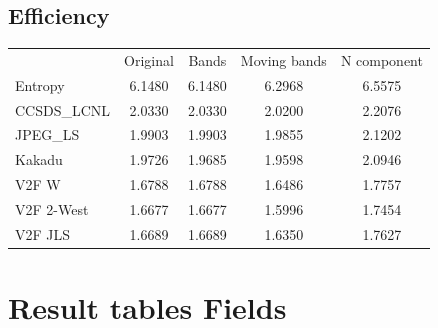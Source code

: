 \documentclass{article}
\begin{document}
\subsection*{Efficiency}
\begin{table}[h]
\begin{tabular}{lcccc}
\rowcolor[HTML]{C0C0C0} 
 & Original & Bands & Moving bands & N component \\
\cellcolor[HTML]{C0C0C0}Entropy & \cellcolor[HTML]{E0E0E0} 6.1480 &  \cellcolor[HTML]{E0E0E0} 6.1480 &  \cellcolor[HTML]{E0E0E0} 6.2968 &  \cellcolor[HTML]{E0E0E0} 6.5575\\ 
\cellcolor[HTML]{C0C0C0}CCSDS\_LCNL & \cellcolor[HTML]{DAE8FC}2.0330 & \cellcolor[HTML]{DAE8FC}2.0330 & 2.0200 & 2.2076  \\
\cellcolor[HTML]{C0C0C0}JPEG\_LS    & \cellcolor[HTML]{DAE8FC}1.9903 & \cellcolor[HTML]{DAE8FC}1.9903 & 1.9855 & 2.1202  \\
\cellcolor[HTML]{C0C0C0}Kakadu      & 1.9726 & 1.9685 & 1.9598 & \cellcolor[HTML]{DAE8FC}2.0946  \\
\cellcolor[HTML]{C0C0C0}V2F W       & 1.6788 & 1.6788 & 1.6486 & \cellcolor[HTML]{DAE8FC}1.7757  \\
\cellcolor[HTML]{C0C0C0}V2F 2-West  & 1.6677 & 1.6677 & 1.5996 & \cellcolor[HTML]{DAE8FC}1.7454  \\
\cellcolor[HTML]{C0C0C0}V2F JLS     & 1.6689 & 1.6689 & 1.6350 & \cellcolor[HTML]{DAE8FC}1.7627  \\
\end{tabular}
\end{table}


\newpage

\section*{Result tables Fields}
\end{document}
